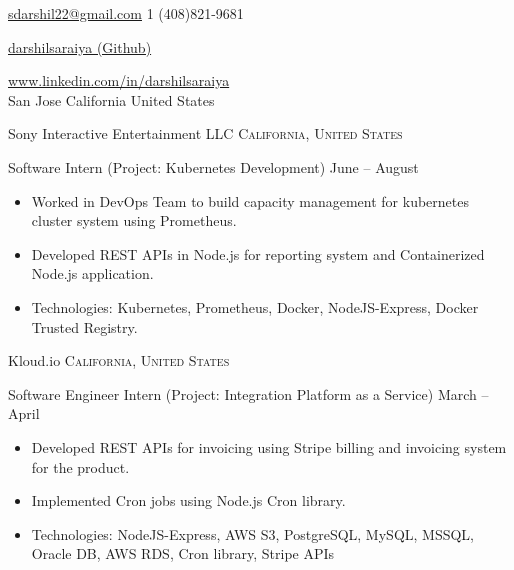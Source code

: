 \documentclass[10pt,a4paper]{article}
\begin{document}
\sloppy  %



\nobreakvspace{0.4em}  %

\noindent\href{mailto:sdarshil22.at.gmail.dot.com}{sdarshil22\mbox{}@\mbox{}gmail.com}\sbull
\textsmaller{+}1 (408)821-9681\sbull
{\newnums \href{https://github.com/darshilsaraiya}{darshilsaraiya (Github)}\sbull
{\mewmums \href{https://www.linkedin.com/in/darshilsaraiya/}{www.linkedin.com/in/darshilsaraiya}
\\
{San Jose\sbull
California\sbull
United States
}


\spacedhrule{0.0em}{-0.4em}



\headedsection  %
  {Sony Interactive Entertainment LLC}
  {\textsc{California, United States}} {%
  \headedsubsection
    {Software Intern (Project: Kubernetes Development)}
    {June  -- August }
    {\bodytext
    {
    \begin{itemize}
        \item Worked in DevOps Team to build capacity management for kubernetes cluster system using Prometheus. 
        \item Developed REST APIs in Node.js for reporting system and Containerized Node.js application.
        \item Technologies: Kubernetes, Prometheus, Docker, NodeJS-Express, Docker Trusted Registry.
    \end{itemize}}}
}

\headedsection  %
  {Kloud.io}
  {\textsc{California, United States}} {%
  \headedsubsection
    {Software Engineer Intern (Project: Integration Platform as a Service)}
    {March  -- April }
    {\bodytext
    {
    \begin{itemize}
        \item Developed REST APIs for invoicing using Stripe billing and invoicing system for the product.
        \item Implemented Cron jobs using Node.js Cron library.
        \item Technologies: NodeJS-Express, AWS S3, PostgreSQL, MySQL, MSSQL, Oracle DB, AWS RDS, Cron library, Stripe APIs
    \end{itemize}}}
}

}}
\end{document}
